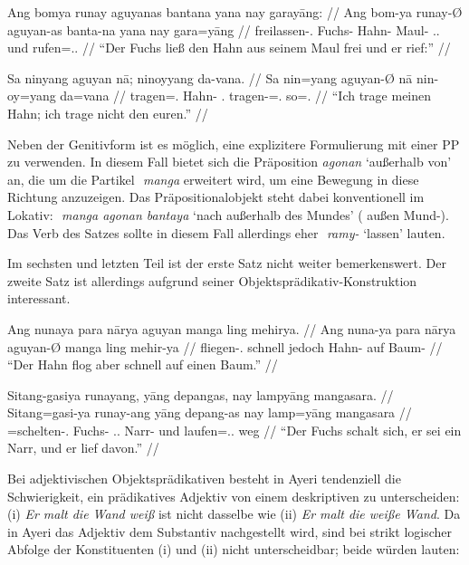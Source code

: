 \documentclass[12pt,paper=a4]{scrartcl}
\newcommand{\TsgM}{{\Tsg}.{\M}}
\newcommand{\fw}[1]{\textit{#1}} %
\newcommand{\zwsp}{\mbox{​}} %
\newcommand{\rayr}[2]{\zwsp\smash{{\Tagati #1}} \emph{#2}} %
\newcommand{\xayr}[3]{\zwsp\smash{\Tagati #1} \emph{#2} `#3'} %
\begin{document}
\pex %
\a\label{ex:genabl}\begingl
	\gla Ang bomya runay aguyanas bantana yana nay garayāng: //
	\glb Ang bom-ya runay-Ø aguyan-as banta-na yana nay gara=yāng //
	\glc \AgtT{} freilassen-\TsgM{} Fuchs-\Top{} Hahn-\Parg{} Maul-\Gen{} \TsgM{}.\Gen{} und rufen=\TsgM{}.\Aarg{} //
	\glft \enquote{Der Fuchs ließ den Hahn aus seinem Maul frei und er rief:} //
\endgl

\a\begingl
	\gla Sa ninyang aguyan nā; ninoyyang da-vana. //
	\glb Sa nin=yang aguyan-Ø nā nin-oy=yang da=vana //
	\glc \PatT{} tragen=\Fsg{}.\Aarg{} Hahn-\Top{} \Fsg{}.\Gen{} tragen-\Neg{}=\Fsg{}.\Aarg{} so=\Spl{}.\Gen{} //
	\glft \enquote{Ich trage meinen Hahn; ich trage nicht den euren.} //
\endgl

\xe

Neben der Genitivform ist es möglich, eine explizitere Formulierung mit einer PP zu verwenden. In diesem Fall bietet sich die Präposition \xayr{AgonnF}{agonan}{außerhalb von} an, die um die Partikel \rayr{mN}{manga} erweitert wird, um eine Bewegung in diese Richtung anzuzeigen. Das Präpositionalobjekt steht dabei konventionell im Lokativ: \xayr{mN AgonnF bMty}{manga agonan bantaya}{nach außerhalb des Mundes} (\Dyn{} außen Mund-\Loc{}). Das Verb des Satzes sollte in diesem Fall allerdings eher \xayr{rmYF/}{ramy-}{lassen} lauten.

Im sechsten und letzten Teil ist der erste Satz nicht weiter bemerkenswert. Der zweite Satz ist allerdings aufgrund seiner Objektsprädikativ-Konstruktion interessant.

\pex %
\a\begingl
	\gla Ang nunaya para nārya aguyan manga ling mehirya. //
	\glb Ang nuna-ya para nārya aguyan-Ø manga ling mehir-ya //
	\glc \AgtT{} fliegen-\TsgM{} schnell jedoch Hahn-\Top{} \Dyn{} auf Baum-\Loc{} //
	\glft \enquote{Der Hahn flog aber schnell auf einen Baum.} //
\endgl

\a\label{ex:objpred}\begingl
	\gla Sitang-gasiya runayang, yāng depangas, nay lampyāng mangasara. //
	\glb Sitang=gasi-ya runay-ang yāng depang-as nay lamp=yāng mangasara //
	\glc \Refl{}=schelten-\TsgM{} Fuchs-\Aarg{} \TsgM{}.\Aarg{} Narr-\Parg{} und laufen=\TsgM{}.\Aarg{} weg //
	\glft \enquote{Der Fuchs schalt sich, er sei ein Narr, und er lief davon.} //
\endgl

\xe

Bei adjektivischen Objektsprädikativen besteht in Ayeri tendenziell die Schwierigkeit, ein prädikatives Adjektiv von einem deskriptiven zu unterscheiden: (i) \fw{Er malt die Wand weiß} ist nicht dasselbe wie (ii) \fw{Er malt die weiße Wand}. Da in Ayeri das Adjektiv dem Substantiv nachgestellt wird, sind bei strikt logischer Abfolge der Konstituenten (i) und (ii) nicht unterscheidbar; beide würden lauten:
\end{document}
